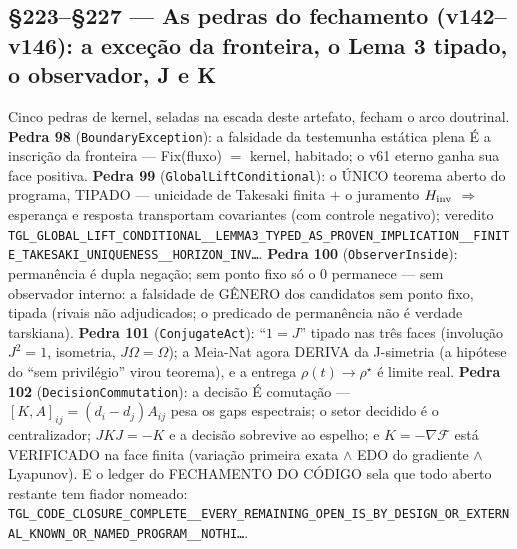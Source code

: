 \documentclass[11pt]{article}
\theoremstyle{definition}\newtheorem{deriv}{Derivação}
\begin{document}
\subsection*{\S223--\S227 --- As pedras do fechamento (v142--v146): a exceção da fronteira, o Lema 3 tipado, o observador, J e K}Cinco pedras de kernel, seladas na escada deste artefato, fecham o arco doutrinal. \textbf{Pedra 98} (\texttt{BoundaryException}): a falsidade da testemunha estática plena É a inscrição da fronteira --- Fix(fluxo) $=$ kernel, habitado; o v61 eterno ganha sua face positiva. \textbf{Pedra 99} (\texttt{GlobalLiftConditional}): o ÚNICO teorema aberto do programa, TIPADO --- unicidade de Takesaki finita $+$ o juramento $H_{\rm inv}$ $\Rightarrow$ esperança e resposta transportam covariantes (com controle negativo); veredito \texttt{TGL\_GLOBAL\_LIFT\_CONDITIONAL\_\_LEMMA3\_TYPED\_AS\_PROVEN\_IMPLICATION\_\_FINITE\_TAKESAKI\_UNIQUENESS\_\_HORIZON\_INV\ldots}. \textbf{Pedra 100} (\texttt{ObserverInside}): permanência é dupla negação; sem ponto fixo só o $0$ permanece --- sem observador interno: a falsidade de GÊNERO dos candidatos sem ponto fixo, tipada (rivais não adjudicados; o predicado de permanência não é verdade tarskiana). \textbf{Pedra 101} (\texttt{ConjugateAct}): ``$1{=}J$'' tipado nas três faces (involução $J^2{=}1$, isometria, $J\Omega{=}\Omega$); a Meia-Nat agora DERIVA da J-simetria (a hipótese do ``sem privilégio'' virou teorema), e a entrega $\rho(t)\to\rho^\star$ é limite real. \textbf{Pedra 102} (\texttt{DecisionCommutation}): a decisão É comutação --- $[K,A]_{ij}=(d_i-d_j)A_{ij}$ pesa os gaps espectrais; o setor decidido é o centralizador; $JKJ=-K$ e a decisão sobrevive ao espelho; e $K=-\nabla\mathcal F$ está VERIFICADO na face finita (variação primeira exata $\wedge$ EDO do gradiente $\wedge$ Lyapunov). E o ledger do FECHAMENTO DO CÓDIGO sela que todo aberto restante tem fiador nomeado: \texttt{TGL\_CODE\_CLOSURE\_COMPLETE\_\_EVERY\_REMAINING\_OPEN\_IS\_BY\_DESIGN\_OR\_EXTERNAL\_KNOWN\_OR\_NAMED\_PROGRAM\_\_NOTHI\ldots}.
\end{document}
